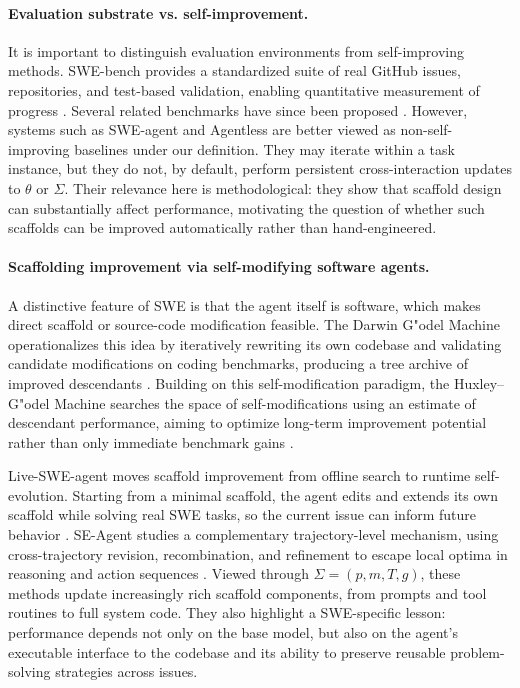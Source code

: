 \paragraph{Evaluation substrate vs. self-improvement.}
It is important to distinguish evaluation environments from self-improving methods. SWE-bench provides a standardized suite of real GitHub issues, repositories, and test-based validation, enabling quantitative measurement of progress \citep{jimenez2024swebenchlanguagemodelsresolve}. Several related benchmarks have since been proposed \citep{deng2025swebenchproaiagents, aleithan2024swebenchenhancedcodingbenchmark, yang2025swebench}. However, systems such as SWE-agent \citep{yang2024sweagentagentcomputerinterfacesenable} and Agentless \citep{xia2024agentlessdemystifyingllmbasedsoftware} are better viewed as non-self-improving baselines under our definition. They may iterate within a task instance, but they do not, by default, perform persistent cross-interaction updates to $\theta$ or $\Sigma$. Their relevance here is methodological: they show that scaffold design can substantially affect performance, motivating the question of whether such scaffolds can be improved automatically rather than hand-engineered.

\paragraph{Scaffolding improvement via self-modifying software agents.}
A distinctive feature of SWE is that the agent itself is software, which makes direct scaffold or source-code modification feasible. The Darwin G"odel Machine operationalizes this idea by iteratively rewriting its own codebase and validating candidate modifications on coding benchmarks, producing a tree archive of improved descendants \citep{zhang2025darwingodelmachineopenended}. Building on this self-modification paradigm, the Huxley--G"odel Machine searches the space of self-modifications using an estimate of descendant performance, aiming to optimize long-term improvement potential rather than only immediate benchmark gains \citep{wang2025huxleygodelmachinehumanlevelcoding}.

Live-SWE-agent moves scaffold improvement from offline search to runtime self-evolution. Starting from a minimal scaffold, the agent edits and extends its own scaffold while solving real SWE tasks, so the current issue can inform future behavior \citep{xia2025livesweagentsoftwareengineeringagents}. SE-Agent studies a complementary trajectory-level mechanism, using cross-trajectory revision, recombination, and refinement to escape local optima in reasoning and action sequences \citep{lin2025seagentselfevolutiontrajectoryoptimization}. Viewed through $\Sigma=(p,m,T,g)$, these methods update increasingly rich scaffold components, from prompts and tool routines to full system code. They also highlight a SWE-specific lesson: performance depends not only on the base model, but also on the agent's executable interface to the codebase and its ability to preserve reusable problem-solving strategies across issues.

